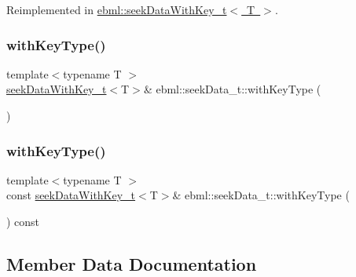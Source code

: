 Reimplemented in \mbox{\hyperlink{classebml_1_1seekDataWithKey__t_afc028f689e5c536e26ca8619d6dbb0a2}{ebml\+::seek\+Data\+With\+Key\+\_\+t$<$ T $>$}}.

\mbox{\label{classebml_1_1seekData__t_a1c5d23645387f0d93a078d2227893b50}} 
\subsubsection{\texorpdfstring{with\+Key\+Type()}{withKeyType()}\hspace{0.1cm}{\footnotesize\ttfamily [1/2]}}
{\footnotesize\ttfamily template$<$typename T $>$ \\
\mbox{\hyperlink{classebml_1_1seekDataWithKey__t}{seek\+Data\+With\+Key\+\_\+t}}$<$T$>$\& ebml\+::seek\+Data\+\_\+t\+::with\+Key\+Type (\begin{DoxyParamCaption}{ }\end{DoxyParamCaption})}

\mbox{\label{classebml_1_1seekData__t_aea1960bbf31310cf899420a7a36d5a49}} 
\subsubsection{\texorpdfstring{with\+Key\+Type()}{withKeyType()}\hspace{0.1cm}{\footnotesize\ttfamily [2/2]}}
{\footnotesize\ttfamily template$<$typename T $>$ \\
const \mbox{\hyperlink{classebml_1_1seekDataWithKey__t}{seek\+Data\+With\+Key\+\_\+t}}$<$T$>$\& ebml\+::seek\+Data\+\_\+t\+::with\+Key\+Type (\begin{DoxyParamCaption}{ }\end{DoxyParamCaption}) const}



\subsection{Member Data Documentation}
\mbox{\label{classebml_1_1seekData__t_a0a25256a0cd61d4077bb37e064198125}} 
